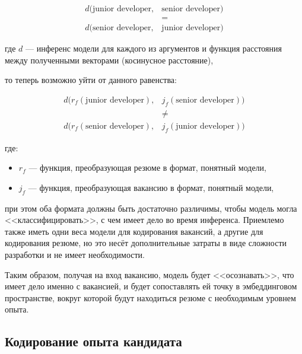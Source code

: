 \documentclass[14pt]{mmcs_article}
\begin{document}
\begin{equation}
  \label{eq:assymetric_search_problem}
  \begin{aligned}
    d(\text{junior developer}, & \text{senior developer}) \\
                               & =                        \\
    d(\text{senior developer}, & \text{junior developer})
  \end{aligned}
\end{equation}

где $d$ --- инференс модели для каждого из аргументов и функция расстояния между полученными векторами (косинусное расстояние),

то теперь возможно уйти от данного равенства:

\begin{equation}
  \label{eq:solved_assymetric_search_problem}
  \begin{aligned}
    d(r_{f}(\text{junior developer}), & j_{f}(\text{senior developer})) \\
                                      & \neq                            \\
    d(r_{f}(\text{senior developer}), & j_{f}(\text{junior developer}))
  \end{aligned}
\end{equation}

где:
\begin{itemize}
  \item $r_{f}$ --- функция, преобразующая резюме в формат, понятный модели,
  \item $j_{f}$ --- функция, преобразующая вакансию в формат, понятный модели,
\end{itemize}

при этом оба формата должны быть достаточно различимы, чтобы модель могла <<классифицировать>>,  с чем имеет дело во время инференса. Приемлемо также иметь одни веса модели для кодирования вакансий, а другие для кодирования резюме, но это несёт дополнительные затраты в виде сложности разработки и не имеет необходимости.

Таким образом, получая на вход вакансию, модель будет <<осознавать>>, что имеет дело именно с вакансией, и будет сопоставлять ей точку в эмбеддинговом пространстве, вокруг которой будут находиться резюме с необходимым уровнем опыта.

\subsection{Кодирование опыта кандидата}
\end{document}
